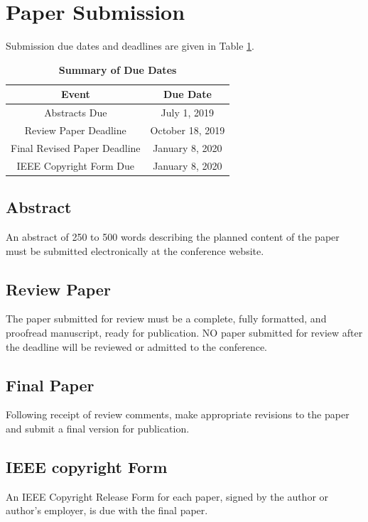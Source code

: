 \documentclass[twocolumn,letterpaper]{IEEEAerospaceCLS}  %
\begin{document}
\section{Paper Submission}
Submission due dates and deadlines are given in Table \ref{DueDates}.

\begin{table}
\renewcommand{\arraystretch}{1.3}
\caption{\bf Summary of Due Dates}
\label{DueDates}
\centering
\begin{tabular}{|c|c|}
\hline
\bfseries Event & \bfseries Due Date \\
\hline\hline
Abstracts Due               & July 1, 2019 \\
Review Paper Deadline & October 18, 2019 \\
Final Revised Paper Deadline          & January 8, 2020\\
IEEE Copyright Form Due     & January 8, 2020\\
\hline
\end{tabular}
\end{table}

\subsection{Abstract}
An abstract of 250 to 500 words describing the planned content of the paper must be submitted electronically at the conference website.

\subsection{Review Paper}
The paper submitted for review must be a complete, fully formatted, and proofread manuscript, ready for publication. NO paper submitted for review after the deadline will be reviewed or admitted to the conference.

\subsection{Final Paper}
Following receipt of review comments, make appropriate revisions to the paper and submit a final version for publication.

\subsection{IEEE copyright Form}
An IEEE Copyright Release Form for each paper, signed by the author or author's employer, is due with the final paper. 
\end{document}
